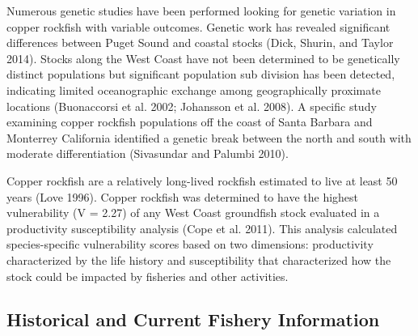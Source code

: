 \documentclass[11pt,
  english,
  a4paper,
]{article}
\begin{document}
Numerous genetic studies have been performed looking for genetic variation in copper rockfish with variable outcomes. Genetic work has revealed significant differences between Puget Sound and coastal stocks {(Dick, Shurin, and Taylor 2014)\leavevmode\tagmcend\tagstructend}. Stocks along the West Coast have not been determined to be genetically distinct populations but significant population sub division has been detected, indicating limited oceanographic exchange among geographically proximate locations {(Buonaccorsi et al. 2002; Johansson et al. 2008)\leavevmode\tagmcend\tagstructend}. A specific study examining copper rockfish populations off the coast of Santa Barbara and Monterrey California identified a genetic break between the north and south with moderate differentiation {(Sivasundar and Palumbi 2010)\leavevmode\tagmcend\tagstructend}.

\leavevmode\tagmcend\tagstructend\par


Copper rockfish are a relatively long-lived rockfish estimated to live at least 50 years {(Love 1996)\leavevmode\tagmcend\tagstructend}. Copper rockfish was determined to have the highest vulnerability (V = 2.27) of any West Coast groundfish stock evaluated in a productivity susceptibility analysis {(Cope et al. 2011)\leavevmode\tagmcend\tagstructend}. This analysis calculated species-specific vulnerability scores based on two dimensions: productivity characterized by the life history and susceptibility that characterized how the stock could be impacted by fisheries and other activities.

\leavevmode\tagmcend\tagstructend\par


\hypertarget{historical-and-current-fishery-information}{%
\subsection{Historical and Current Fishery Information}\label{historical-and-current-fishery-information}}

\leavevmode\tagmcend\tagstructend
\end{document}
